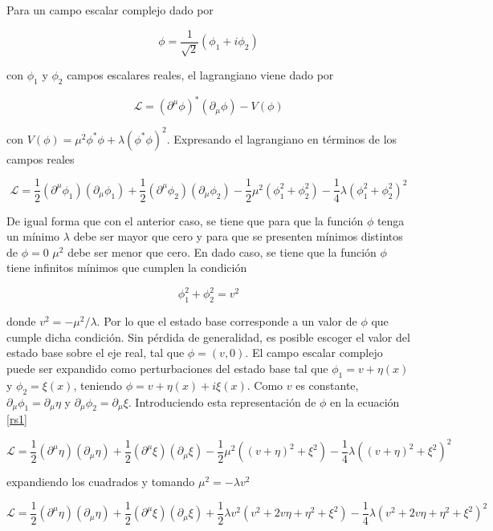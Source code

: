 Para un campo escalar complejo dado por

$$ \phi = \frac{1}{\sqrt{2}}(\phi_1 + i\phi_2) $$

con $\phi_1$ y $\phi_2$ campos escalares reales, el lagrangiano viene dado por

$$ \mathcal{L} = (\partial^{\mu}\phi)^*(\partial_{\mu}\phi) - V(\phi)$$

con $V(\phi)=\mu^2\phi^*\phi + \lambda (\phi^*\phi)^2$. Expresando el lagrangiano en términos de los campos reales

\begin{equation}
\mathcal{L} = \frac{1}{2} (\partial^{\mu}\phi_1)(\partial_{\mu}\phi_1) + \frac{1}{2} (\partial^{\mu}\phi_2)(\partial_{\mu}\phi_2) - \frac{1}{2}\mu^2 (\phi_1^2+\phi_2^2) - \frac{1}{4}\lambda (\phi_1^2+\phi_2^2)^2
\label{rs1}
\end{equation}

De igual forma que con el anterior caso, se tiene que para que la función $\phi$ tenga un mínimo $\lambda$ debe ser mayor que cero y para que se presenten mínimos distintos de $\phi = 0$ $\mu^2$ debe ser menor que cero. En dado caso, se tiene que la función $\phi$ tiene infinitos mínimos que cumplen la condición

$$ \phi_1^2 + \phi_2^2 = v^2 $$

donde $v^2=- \mu^2/\lambda$. Por lo que el estado base corresponde a un valor de $\phi$ que cumple dicha condición. Sin pérdida de generalidad, es posible escoger el valor del estado base sobre el eje real, tal que $\phi = (v,0)$. El campo escalar complejo puede ser expandido como perturbaciones del estado base tal que $\phi_1 = v + \eta(x)$ y $\phi_2=\xi(x)$, teniendo $\phi = v + \eta(x)+i\xi(x)$. Como $v$ es constante, $\partial_{\mu}\phi_1=\partial_{\mu}\eta$ y $\partial_{\mu}\phi_2 = \partial_{\mu}\xi$. Introduciendo esta representación de $\phi$ en la ecuación \ref{rs1}

$$ \mathcal{L} = \frac{1}{2} (\partial^{\mu}\eta)(\partial_{\mu}\eta) + \frac{1}{2} (\partial^{\mu}\xi)(\partial_{\mu}\xi) - \frac{1}{2}\mu^2 ((v+\eta)^2+\xi^2) - \frac{1}{4}\lambda ((v+\eta)^2+\xi^2)^2 $$

expandiendo los cuadrados y tomando $\mu^2=-\lambda v^2$

$$ \mathcal{L} = \frac{1}{2} (\partial^{\mu}\eta)(\partial_{\mu}\eta) + \frac{1}{2} (\partial^{\mu}\xi)(\partial_{\mu}\xi) + \frac{1}{2}\lambda v^2 (v^2 + 2v\eta + \eta^2 +\xi^2) - \frac{1}{4}\lambda (v^2 + 2v\eta + \eta^2+\xi^2)^2 $$

